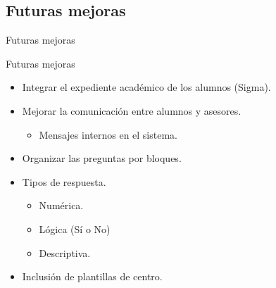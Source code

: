 \documentclass[10pt, hyperref={pdfpagelabels=false}]{beamer}
\begin{document}
    \subsection{Futuras mejoras}
      \begin{frame}{Futuras mejoras}
        \begin{block}{Futuras mejoras}
          \begin{itemize}
            \item Integrar el expediente académico de los alumnos (Sigma).
            \item Mejorar la comunicación entre alumnos y asesores.
            \begin{itemize}
              \item Mensajes internos en el sistema.
            \end{itemize}
            \item Organizar las preguntas por bloques.
            \item Tipos de respuesta.
            \begin{itemize}
              \item Numérica.
              \item Lógica (Sí o No)
              \item Descriptiva.
            \end{itemize}
            \item Inclusión de plantillas de centro.
          \end{itemize}
        \end{block}
      \end{frame}
\end{document}
